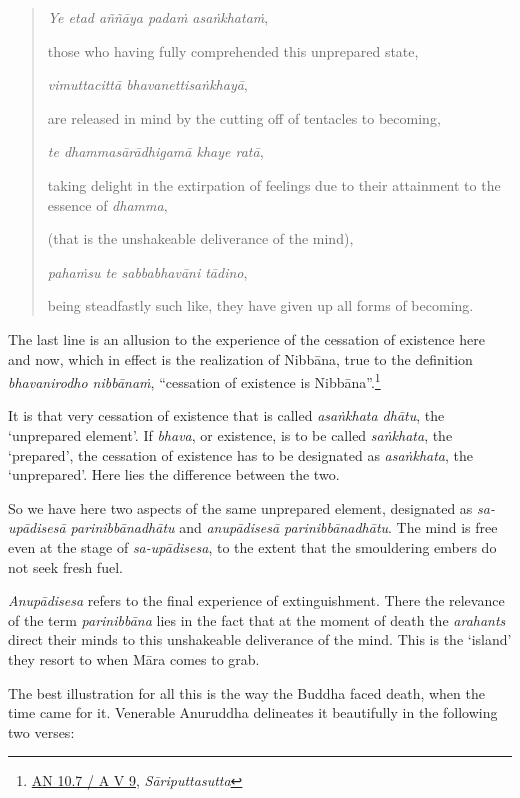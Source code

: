 \begin{quote}
\emph{Ye etad aññāya padaṁ asaṅkhataṁ},

those who having fully comprehended this unprepared state,

\emph{vimuttacittā bhavanettisaṅkhayā},

are released in mind by the cutting off of tentacles to becoming,

\emph{te dhammasārādhigamā khaye ratā},

taking delight in the extirpation of feelings due to their attainment to the essence of \emph{dhamma},

(that is the unshakeable deliverance of the mind),

\emph{pahaṁsu te sabbabhavāni tādino},

being steadfastly such like, they have given up all forms of becoming.
\end{quote}

The last line is an allusion to the experience of the cessation of existence here and now, which in effect is the realization of Nibbāna, true to the definition \emph{bhavanirodho nibbānaṁ}, ``cessation of existence is Nibbāna''.\footnote{\href{https://suttacentral.net/an10.7/pli/ms}{AN 10.7 / A V 9}, \emph{Sāriputtasutta}}

It is that very cessation of existence that is called \emph{asaṅkhata dhātu}, the `unprepared element'. If \emph{bhava}, or existence, is to be called \emph{saṅkhata}, the `prepared', the cessation of existence has to be designated as \emph{asaṅkhata}, the `unprepared'. Here lies the difference between the two.

So we have here two aspects of the same unprepared element, designated as \emph{sa-upādisesā parinibbānadhātu} and \emph{anupādisesā parinibbānadhātu}. The mind is free even at the stage of \emph{sa-upādisesa}, to the extent that the smouldering embers do not seek fresh fuel.

\emph{Anupādisesa} refers to the final experience of extinguishment. There the relevance of the term \emph{parinibbāna} lies in the fact that at the moment of death the \emph{arahants} direct their minds to this unshakeable deliverance of the mind. This is the `island' they resort to when Māra comes to grab.

The best illustration for all this is the way the Buddha faced death, when the time came for it. Venerable Anuruddha delineates it beautifully in the following two verses:

